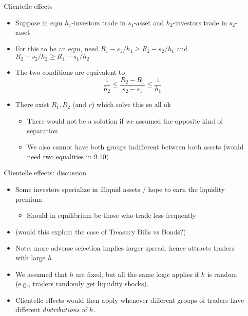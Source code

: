 \documentclass[english,10pt
,aspectratio=169
]{beamer}
\begin{document}
\begin{frame}{Clientelle effects}
	\begin{itemize}
		\item Suppose in eqm $h_1$-investors trade in $s_1$-asset and $h_2$-investors trade in $s_2$-asset
		\item For this to be an eqm, need $R_1 - s_1/h_1 \geq R_2 - s_2/h_1$ and $R_2 - s_2/h_2 \geq R_1 - s_1/h_2$
		\item The two conditions are equivalent to
		\begin{equation}\tag{9.10}
			\frac{1}{h_2} \leq \frac{R_2 - R_1}{s_2 - s_1} \leq \frac{1}{h_1}
		\end{equation}
		\pause 
		\item There exist $R_1,R_2$ (and $r$) which solve this so all ok
		\begin{itemize}
			\item There would not be a solution if we assumed the opposite kind of separation
			\item We also cannot have both groups indifferent between both assets (would need two equalities in 9.10)
		\end{itemize}
	\end{itemize}
\end{frame}


\begin{frame}{Clientelle effects: discussion}
	\begin{itemize}
		\item Some investors specialize in illiquid assets / hope to earn the liquidity premium
		\begin{itemize}
			\item Should in equilibrium be those who trade less frequently
		\end{itemize}
		\item (would this explain the case of Treasury Bills vs Bonds?) 
		\item Note: more adverse selection implies larger spread, hence attracts traders with large $h$
		\pause\bigskip 
		\item We assumed that $h$ are fixed, but all the same logic applies if $h$ is random (e.g., traders randomly get liquidity shocks).
		\item Clientelle effects would then apply whenever different groups of traders have different \emph{distributions} of $h$.
	\end{itemize}
\end{frame}
\end{document}
